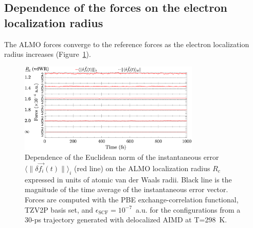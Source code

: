 \documentclass[aip,jcp,reprint,amsmath,amssymb]{revtex4-1}
\begin{document}
\subsection{Dependence of the forces on the electron localization radius}

The ALMO forces converge to the reference forces as the electron localization radius increases (Figure~\ref{fig:forcecomp}).

\begin{figure}[h!]
\includegraphics[trim={0cm 0cm 0.1cm 0.1cm},clip,width=8.6cm]{5.eps}
\caption{\label{fig:forcecomp} Dependence of the Euclidean norm of the instantaneous error $\langle \| \delta \vec{f_{i}}(t) \| \rangle_{i}$ (red line) on the ALMO localization radius $R_c$ expressed in units of atomic van der Waals radii. Black line is the magnitude of the time average of the instantaneous error vector. %
Forces are computed with the PBE exchange-correlation functional, TZV2P basis set, and $\epsilon_{\text{SCF}} = 10^{-7}$~a.u. for the configurations from a 30-ps trajectory generated with delocalized AIMD at T=298~K.}
\end{figure}


\end{document}
